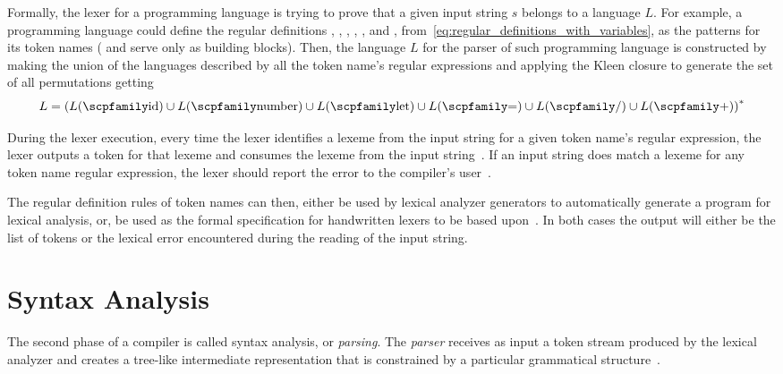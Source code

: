 \documentclass[
  oneside,
  english,
  coorientadorbanca,
  noabntexcite
]{ufsc-thesis-rn46-2019}
\newcommand{\code}[1]{\text{\scpfamily\setlength\spaceskip{0.35em}#1}}
\begin{document}
Formally, the lexer for a programming language is trying to prove that a given input string $s$ belongs to a language $L$.
For example, a programming language could define the regular definitions \code{id}, \code{number}, \code{let}, \code{=}, \code{/}, and \code{+}, from~\eqref{eq:regular_definitions_with_variables}, as the patterns for its token names (\code{digit} and \code{letter} serve only as building blocks).
Then, the language $L$ for the parser of such programming language is constructed by making the union of the languages described by all the token name's regular expressions and applying the Kleen closure to generate the set of all permutations getting
\begin{equation*}
  L = {(L(\code{id}) \cup L(\code{number}) \cup L(\code{let}) \cup L(\code{=}) \cup L(\code{/}) \cup L(\code{+}))}^*
\end{equation*}

During the lexer execution, every time the lexer identifies a lexeme from the input string for a given token name's regular expression, the lexer outputs a token for that lexeme and consumes the lexeme from the input string~\cite{Aho:2006:CPT:1177220}.
If an input string does match a lexeme for any token name regular expression, the lexer should report the error to the compiler's user~\cite{Aho:2006:CPT:1177220}.

The regular definition rules of token names can then, either be used by lexical analyzer generators to automatically generate a program for lexical analysis, or, be used as the formal specification for handwritten lexers to be based upon~\cite{Aho:2006:CPT:1177220}.
In both cases the output will either be the list of tokens or the lexical error encountered during the reading of the input string.

\section{Syntax Analysis}\label{chapter:background:sec:syntax}

The second phase of a compiler is called syntax analysis, or \textit{parsing}.
The \textit{parser} receives as input a token stream produced by the lexical analyzer and creates a tree-like intermediate representation that is constrained by a particular grammatical structure~\cite{Aho:2006:CPT:1177220}.
\end{document}
